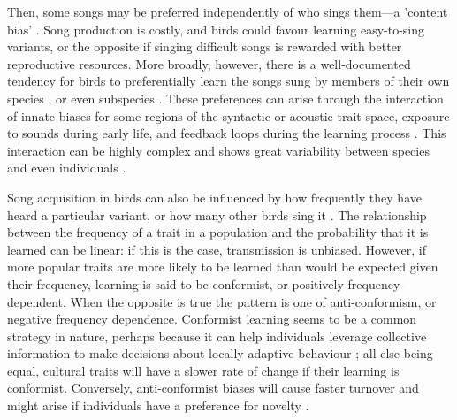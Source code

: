 Then, some songs may be preferred independently of who sings them---a 'content bias’ \autocite{Richerson2005}. Song production is costly, and birds could favour learning easy-to-sing variants, or the opposite if singing difficult songs is rewarded with better reproductive resources. More broadly, however, there is a well-documented tendency for birds to preferentially learn the songs sung by members of their own species \autocite{slabbekoorn2002}, or even subspecies \autocite{nelson2000}. These preferences can arise through the interaction of innate biases for some regions of the syntactic or acoustic trait space, exposure to sounds during early life, and feedback loops during the learning process \autocite{feher2009,Feher2017,verzijden2012}. This interaction can be highly complex and shows great variability between species and even individuals \autocite{james2020,mets2017,mets2019,tencate2007}. 

Song acquisition in birds can also be influenced by how frequently they have heard a particular variant, or how many other birds sing it \autocite{aplin2015c,vanleeuwen2015}. The relationship between the frequency of a trait in a population and the probability that it is learned can be linear: if this is the case, transmission is unbiased. However, if more popular traits are more likely to be learned than would be expected given their frequency, learning is said to be conformist, or positively frequency-dependent. When the opposite is true the pattern is one of anti-conformism, or negative frequency dependence. Conformist learning seems to be a common strategy in nature, perhaps because it can help individuals leverage collective information to make decisions about locally adaptive behaviour \autocite{danchin2018,pike2010,whiten2019}; all else being equal, cultural traits will have a slower rate of change if their learning is conformist. Conversely, anti-conformist biases will cause faster turnover \autocite{acerbi2014} and might arise if individuals have a preference for novelty \autocite{Smaldino2015}.

